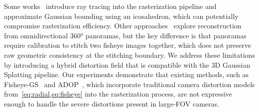 Some works~\cite{moenne20243d} introduce ray tracing into the rasterization pipeline and approximate Gaussian bounding using an icosahedron, which can potentially compromise rasterization efficiency. Other approaches~\cite{li2024omnigs,bai2024360,huang2025sc} explore reconstruction from omnidirectional 360° panoramas, but the key difference is that panoramas require calibration to stitch two fisheye images together, which does not preserve raw geometric consistency at the stitching boundary.
We address these limitations by introducing a hybrid distortion field that is compatible with the 3D Gaussian Splatting pipeline. Our experiments demonstrate that existing methods, such as Fisheye-GS~\cite{liao2024fisheye} and ADOP~\cite{ruckert2022adop}, which incorporate traditional camera distortion models from~\cref{eq:radial,eq:fisheye} into the rasterization process, are not expressive enough to handle the severe distortions present in large-FOV cameras.



